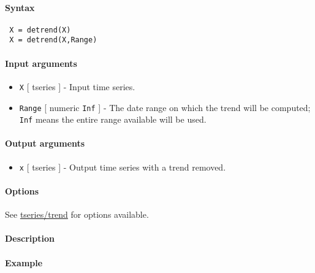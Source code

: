 


	\paragraph{Syntax}
 
 \begin{verbatim}
 X = detrend(X)
 X = detrend(X,Range)
 \end{verbatim}
 
 \paragraph{Input arguments}
 
 \begin{itemize}
 \item
   \texttt{X} {[} tseries {]} - Input time series.
 \item
   \texttt{Range} {[} numeric \textbar{} \texttt{Inf} {]} - The date
   range on which the trend will be computed; \texttt{Inf} means the
   entire range available will be used.
 \end{itemize}
 
 \paragraph{Output arguments}
 
 \begin{itemize}
 \item
   \texttt{x} {[} tseries {]} - Output time series with a trend removed.
 \end{itemize}
 
 \paragraph{Options}
 
 See \url{tseries/trend} for options available.
 
 \paragraph{Description}
 
 \paragraph{Example}


